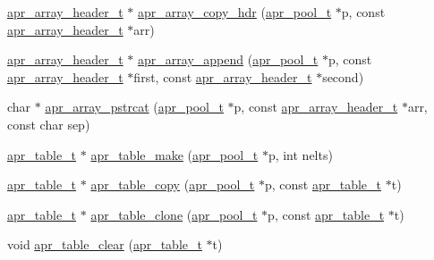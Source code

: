 \begin{DoxyCompactItemize}
\item 
\hyperlink{structapr__array__header__t}{apr\-\_\-array\-\_\-header\-\_\-t} $\ast$ \hyperlink{group__apr__tables_ga6203e9f731bf43e7373857c38d04397d}{apr\-\_\-array\-\_\-copy\-\_\-hdr} (\hyperlink{group__apr__pools_gaf137f28edcf9a086cd6bc36c20d7cdfb}{apr\-\_\-pool\-\_\-t} $\ast$p, const \hyperlink{structapr__array__header__t}{apr\-\_\-array\-\_\-header\-\_\-t} $\ast$arr)
\item 
\hyperlink{structapr__array__header__t}{apr\-\_\-array\-\_\-header\-\_\-t} $\ast$ \hyperlink{group__apr__tables_ga893cade58c5fabecb593cb4ffac7e9be}{apr\-\_\-array\-\_\-append} (\hyperlink{group__apr__pools_gaf137f28edcf9a086cd6bc36c20d7cdfb}{apr\-\_\-pool\-\_\-t} $\ast$p, const \hyperlink{structapr__array__header__t}{apr\-\_\-array\-\_\-header\-\_\-t} $\ast$first, const \hyperlink{structapr__array__header__t}{apr\-\_\-array\-\_\-header\-\_\-t} $\ast$second)
\item 
char $\ast$ \hyperlink{group__apr__tables_ga6232817e4a32ee5619c99fe55e145c7a}{apr\-\_\-array\-\_\-pstrcat} (\hyperlink{group__apr__pools_gaf137f28edcf9a086cd6bc36c20d7cdfb}{apr\-\_\-pool\-\_\-t} $\ast$p, const \hyperlink{structapr__array__header__t}{apr\-\_\-array\-\_\-header\-\_\-t} $\ast$arr, const char sep)
\item 
\hyperlink{group__apr__tables_gad7ea82d6608a4a633fc3775694ab71e4}{apr\-\_\-table\-\_\-t} $\ast$ \hyperlink{group__apr__tables_ga7b0a16a1388c68e66bff32190cf092f6}{apr\-\_\-table\-\_\-make} (\hyperlink{group__apr__pools_gaf137f28edcf9a086cd6bc36c20d7cdfb}{apr\-\_\-pool\-\_\-t} $\ast$p, int nelts)
\item 
\hyperlink{group__apr__tables_gad7ea82d6608a4a633fc3775694ab71e4}{apr\-\_\-table\-\_\-t} $\ast$ \hyperlink{group__apr__tables_gae69f2b0b593bcdbf4c678a0f3dfde5f3}{apr\-\_\-table\-\_\-copy} (\hyperlink{group__apr__pools_gaf137f28edcf9a086cd6bc36c20d7cdfb}{apr\-\_\-pool\-\_\-t} $\ast$p, const \hyperlink{group__apr__tables_gad7ea82d6608a4a633fc3775694ab71e4}{apr\-\_\-table\-\_\-t} $\ast$t)
\item 
\hyperlink{group__apr__tables_gad7ea82d6608a4a633fc3775694ab71e4}{apr\-\_\-table\-\_\-t} $\ast$ \hyperlink{group__apr__tables_ga7e8bc16b272840302545ed4a6a082a6e}{apr\-\_\-table\-\_\-clone} (\hyperlink{group__apr__pools_gaf137f28edcf9a086cd6bc36c20d7cdfb}{apr\-\_\-pool\-\_\-t} $\ast$p, const \hyperlink{group__apr__tables_gad7ea82d6608a4a633fc3775694ab71e4}{apr\-\_\-table\-\_\-t} $\ast$t)
\item 
void \hyperlink{group__apr__tables_ga03f03de545f9a18e25420f261938ffea}{apr\-\_\-table\-\_\-clear} (\hyperlink{group__apr__tables_gad7ea82d6608a4a633fc3775694ab71e4}{apr\-\_\-table\-\_\-t} $\ast$t)

\end{DoxyCompactItemize}
